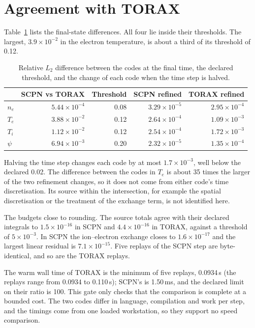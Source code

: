 \documentclass[11pt]{article}
\begin{document}
\section{Agreement with TORAX}

Table~\ref{tab:parity} lists the final-state differences.  All four lie
inside their thresholds.  The largest, $3.9 \times 10^{-2}$ in the electron
temperature, is about a third of its threshold of 0.12.

\begin{table}[ht]
\centering
\caption{Relative $L_2$ difference between the codes at the final time, the
declared threshold, and the change of each code when the time step is halved.}
\label{tab:parity}
\small
\begin{tabular}{lrrrr}
\toprule
 & SCPN vs TORAX & Threshold & SCPN refined & TORAX refined \\
\midrule
$n_e$ & $5.44 \times 10^{-4}$ & 0.08 & $3.29 \times 10^{-5}$ & $2.95 \times 10^{-4}$ \\
$T_e$ & $3.88 \times 10^{-2}$ & 0.12 & $2.64 \times 10^{-4}$ & $1.09 \times 10^{-3}$ \\
$T_i$ & $1.12 \times 10^{-2}$ & 0.12 & $2.54 \times 10^{-4}$ & $1.72 \times 10^{-3}$ \\
$\psi$ & $6.94 \times 10^{-3}$ & 0.20 & $2.32 \times 10^{-5}$ & $1.35 \times 10^{-4}$ \\
\bottomrule
\end{tabular}
\end{table}

Halving the time step changes each code by at most $1.7 \times 10^{-3}$, well
below the declared 0.02.  The difference between the codes in $T_e$ is about
35 times the larger of the two refinement changes, so it does not come from
either code's time discretisation.  Its source within the intersection, for
example the spatial discretisation or the treatment of the exchange term, is
not identified here.

The budgets close to rounding.  The source totals agree with their declared
integrals to $1.5 \times 10^{-16}$ in SCPN and $4.4 \times 10^{-16}$ in TORAX,
against a threshold of $5 \times 10^{-3}$.  In SCPN the ion--electron exchange
closes to $1.6 \times 10^{-17}$ and the largest linear residual is $7.1 \times
10^{-15}$.  Five replays of the SCPN step are byte-identical, and so are the
TORAX replays.

The warm wall time of TORAX is the minimum of five replays, 0.0934\,s (the
replays range from 0.0934 to 0.110\,s); SCPN's is 1.50\,ms, and the declared
limit on their ratio is 100.  This gate only checks that the comparison is
complete at a bounded cost.  The two codes differ in language, compilation
and work per step, and the timings come from one loaded workstation, so they
support no speed comparison.
\end{document}

